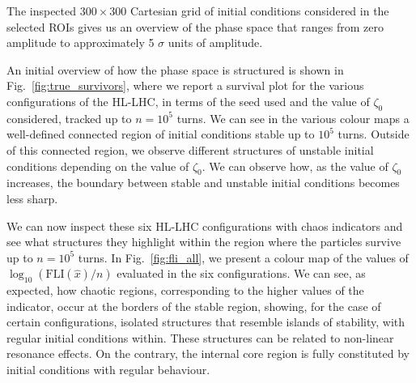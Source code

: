 The inspected $300\times300$ Cartesian grid of initial conditions considered in the selected ROIs gives us an overview of the phase space that ranges from zero amplitude to approximately 5 $\sigma$ units of amplitude.

An initial overview of how the phase space is structured is shown in Fig.~\ref{fig:true_survivors}, where we report a survival plot for the various configurations of the HL-LHC, in terms of the seed used and the value of $\zeta_0$ considered, tracked up to $n=10^5$ turns. We can see in the various colour maps a well-defined connected region of initial conditions stable up to $10^5$ turns. Outside of this connected region, we observe different structures of unstable initial conditions depending on the value of $\zeta_0$. We can observe how, as the value of $\zeta_0$ increases, the boundary between stable and unstable initial conditions becomes less sharp.

We can now inspect these six HL-LHC configurations with chaos indicators and see what structures they highlight within the region where the particles survive up to $n=10^5$ turns. In Fig.~\ref{fig:fli_all}, we present a colour map of the values of $\log_{10}(\mathrm{FLI}(\hat{x})/n)$ evaluated in the six configurations. We can see, as expected, how chaotic regions, corresponding to the higher values of the indicator, occur at the borders of the stable region, showing, for the case of certain configurations, isolated structures that resemble islands of stability, with regular initial conditions within. These structures can be related to non-linear resonance effects. On the contrary, the internal core region is fully constituted by initial conditions with regular behaviour.


